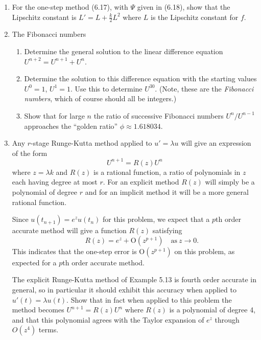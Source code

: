 \documentclass[10pt]{amsart}
\newcommand{\bigo}{{\mathrm O}}
\begin{document}
\begin{enumerate}[label={\bf Problem~{\arabic*}:}]
 \mline
 \item For the one-step method (6.17), with $\Psi$ given in (6.18), show that the Lipschitz constant is $L' = L + \frac{k}{2} L^2$ where $L$ is the Lipschitz constant for $f$.




\mline 
\item  The Fibonacci numbers

\begin{enumerate}
\item Determine the general solution to the linear difference equation
$U^{n+2} = U^{n+1} + U^n$.

\item Determine the solution to this difference equation with the starting
values $U^0=1$, $U^1=1$.  Use this to determine $U^{30}$.
(Note, these are the {\em Fibonacci numbers}, which of course should all be
integers.)

\item Show that for large $n$ the ratio of successive Fibonacci numbers
$U^n/U^{n-1}$ approaches the ``golden ratio'' $\phi \approx 1.618034$.
\end{enumerate} 



\mline
\item 
Any $r$-stage Runge-Kutta method applied to $u'=\lambda u$ will give an
expression of the form
\[
U^{n+1} = R(z)U^n
\]
where $z=\lambda k$ and $R(z)$ is a rational function, a ratio of
polynomials in $z$ each having degree at most $r$.  For an explicit method
$R(z)$ will simply be a polynomial of degree $r$ and for an implicit method
it will be a more general rational function.

Since $u(t_{n+1}) = e^z u(t_n)$ for this problem, we expect that a $p$th
order accurate method will give a function $R(z)$ satisfying
\[
\qquad  R(z) = e^z + \bigo(z^{p+1}) \quad\text{as}~z \to 0.
\]
This indicates that the one-step error is $\bigo(z^{p+1})$ on this problem,
as expected for a $p$th order accurate method.

The explicit
Runge-Kutta method of Example 5.13 is fourth order accurate in general,
so in particular it should exhibit this accuracy when applied to 
$u'(t) = \lambda u(t)$.  Show that in fact when applied to this
problem the method becomes $U^{n+1} = R(z)U^n$ where $R(z)$ is 
a polynomial of degree 4, and that this polynomial agrees with the Taylor
expansion of $e^z$ through $O(z^4)$ terms.


\end{enumerate}
\end{document}
